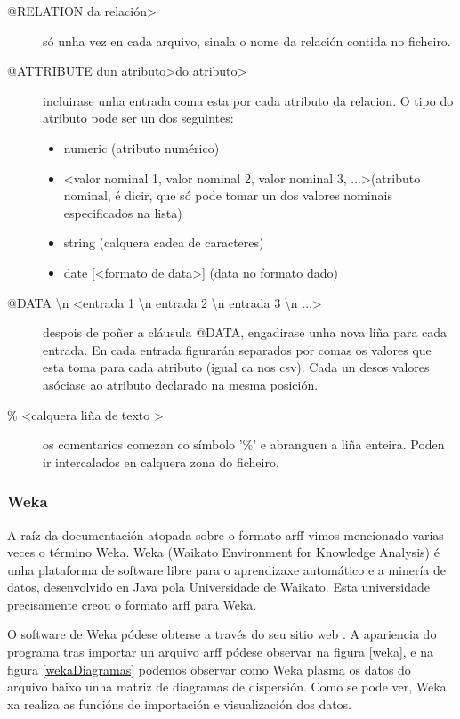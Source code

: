 \begin{description}
\item[@RELATION \textlessnome da relación\textgreater] só unha vez en cada arquivo, sinala o nome da relación contida no ficheiro.
\item[@ATTRIBUTE \textlessnome dun atributo\textgreater \textlesstipo do atributo\textgreater] incluirase unha entrada coma esta por cada atributo da relacion. O tipo do atributo pode ser un dos seguintes:
\begin{itemize}
\item numeric (atributo numérico)
\item \textless valor nominal 1, valor nominal 2, valor nominal 3, ...\textgreater (atributo nominal, é dicir, que só pode tomar un dos valores nominais especificados na lista)
\item string (calquera cadea de caracteres)
\item date [\textless formato de data\textgreater ] (data no formato dado)
\end{itemize} 
\item[@DATA \textbackslash n \textless entrada 1 \textbackslash n entrada 2 \textbackslash n entrada 3 \textbackslash n ...\textgreater] despois de poñer a cláusula @DATA, engadirase unha nova liña para cada entrada. En cada entrada figurarán separados por comas os valores que esta toma para cada atributo (igual ca nos csv). Cada un desos valores asóciase ao atributo declarado na mesma posición.
\item[\% \textless calquera liña de texto \textgreater] os comentarios comezan co símbolo '\%' e abranguen a liña enteira. Poden ir intercalados en calquera zona do ficheiro.
\end{description} 

\subsubsection{Weka}

A raíz da documentación atopada sobre o formato arff vimos mencionado varias veces o término Weka. Weka (Waikato Environment for Knowledge Analysis) é unha plataforma de software libre para o aprendizaxe automático e a minería de datos, desenvolvido en Java pola Universidade de Waikato. Esta universidade precisamente creou o formato arff para Weka.

O software de Weka pódese obterse a través do seu sitio web \cite{weka}. A apariencia do programa tras importar un arquivo arff pódese observar na figura \ref{weka}, e na figura \ref{wekaDiagramas} podemos observar como Weka plasma os datos do arquivo baixo unha matriz de diagramas de dispersión. Como se pode ver, Weka xa realiza as funcións de importación e visualización dos datos.

